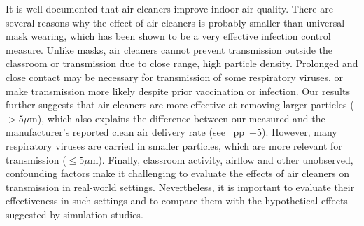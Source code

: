 \documentclass[fleqn,11pt]{wlscirep}
\begin{document}
It is well documented that air cleaners improve indoor air quality.\cite{Park2020Build,Buising2022InfContr,Banholzer2023PLoSMed} There are several reasons why the effect of air cleaners is probably smaller than universal mask wearing, which has been shown to be a very effective infection control measure.\cite{Banholzer2023PLoSMed,Gettings2021,Leung2020NatMed,Milton2013PLoSPathogens} Unlike masks, air cleaners cannot prevent transmission outside the classroom or transmission due to close range, high particle density. Prolonged and close contact may be necessary for transmission of some respiratory viruses,\cite{Leung2020NatMed,Brankston2007LancetID} or make transmission more likely despite prior vaccination or infection.\cite{Lind2023NatCommun} Our results further suggests that air cleaners are more effective at removing larger particles ($>5\mu$m), which also explains the difference between our measured and the manufacturer's reported clean air delivery rate (see \supp~pp~$-$5). However, many respiratory viruses are carried in smaller particles, which are more relevant for transmission ($\leq5\mu$m).\cite{Fennelly2020} Finally, classroom activity, airflow and other unobserved, confounding factors make it challenging to evaluate the effects of air cleaners on transmission in real-world settings. Nevertheless, it is important to evaluate their effectiveness in such settings and to compare them with the hypothetical effects suggested by simulation studies.\cite{Lindsley2021,Cortellessa2023Build}


\end{document}
